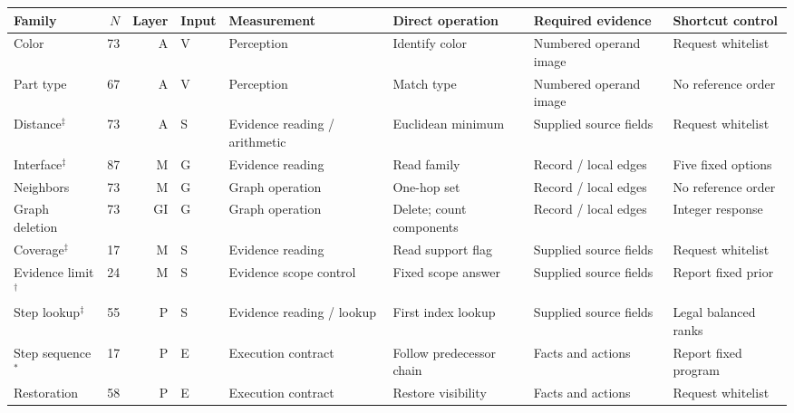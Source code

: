 \begin{tabularx}{\textwidth}{lrrllXXX}
\toprule
Family & $N$ & Layer & Input & Measurement & Direct operation & Required evidence & Shortcut control\\\midrule
Color & 73 & A & V & Perception & Identify color & Numbered operand image & Request whitelist\\
Part type & 67 & A & V & Perception & Match type & Numbered operand image & No reference order\\
Distance$^\ddagger$ & 73 & A & S & Evidence reading / arithmetic & Euclidean minimum & Supplied source fields & Request whitelist\\
Interface$^\ddagger$ & 87 & M & G & Evidence reading & Read family & Record / local edges & Five fixed options\\
Neighbors & 73 & M & G & Graph operation & One-hop set & Record / local edges & No reference order\\
Graph deletion & 73 & GI & G & Graph operation & Delete; count components & Record / local edges & Integer response\\
Coverage$^\ddagger$ & 17 & M & S & Evidence reading & Read support flag & Supplied source fields & Request whitelist\\
Evidence limit$^\dagger$ & 24 & M & S & Evidence scope control & Fixed scope answer & Supplied source fields & Report fixed prior\\
Step lookup$^\ddagger$ & 55 & P & S & Evidence reading / lookup & First index lookup & Supplied source fields & Legal balanced ranks\\
Step sequence$^\ast$ & 17 & P & E & Execution contract & Follow predecessor chain & Facts and actions & Report fixed program\\
Restoration & 58 & P & E & Execution contract & Restore visibility & Facts and actions & Request whitelist\\
\bottomrule
\end{tabularx}
